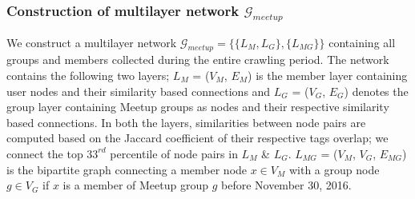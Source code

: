 \subsubsection{Construction of multilayer network $\mathcal{G}_{meetup}$}
We construct a multilayer network $\mathcal{G}_{meetup} =\{\{L_M, L_G\},\{L_{MG}\}\}$ containing all groups and members
collected during the
entire crawling period.
The network contains the following two layers; $L_M$ = ($V_M$, $E_M$) is the member layer containing user nodes and their similarity based
connections and $L_G$ = ($V_G$, $E_G$) denotes the group layer containing Meetup groups as nodes and their respective similarity based 
connections.
In both the layers, similarities between node pairs are computed based on the Jaccard coefficient of their respective tags overlap;
we connect
the top $33^{rd}$ percentile of node pairs in $L_M$ \& $L_G$.
$L_{MG}$ = ($V_M$, $V_G$, $E_{MG}$) is the bipartite graph connecting a member node $x\in V_M$ with a group node $g \in V_G$ if $x$ is
a member of Meetup group $g$ before November 30, 2016.




